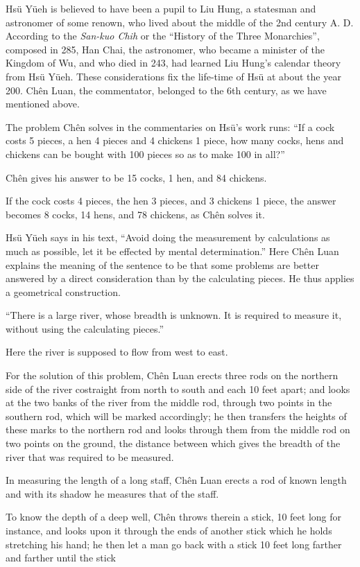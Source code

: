 \documentclass[11pt]{article}
\newcommand{\scanpage}[2]{\clearpage\setcounter{footnote}{0}\noindent{\footnotesize\color{gray}PDF page #1 · #2}\par\medskip}
\newcommand{\scanfooter}{}
\begin{document}
\scanpage{0058}{Part I, printed page 44}

Hsü Yüeh is believed to have been a pupil to Liu Hung, a statesman and astronomer of some renown, who lived about the middle of the 2nd century A. D. According to the \emph{San-kuo Chih} or the ``History of the Three Monarchies'', composed in 285, Han Chai, the astronomer, who became a minister of the Kingdom of Wu, and who died in 243, had learned Liu Hung's calendar theory from Hsü Yüeh. These considerations fix the life-time of Hsü at about the year 200. Chên Luan, the commentator, belonged to the 6th century, as we have mentioned above.

The problem Chên solves in the commentaries on Hsü's work runs: ``If a cock costs 5 pieces, a hen 4 pieces and 4 chickens 1 piece, how many cocks, hens and chickens can be bought with 100 pieces so as to make 100 in all?''

Chên gives his answer to be 15 cocks, 1 hen, and 84 chickens.

If the cock costs 4 pieces, the hen 3 pieces, and 3 chickens 1 piece, the answer becomes 8 cocks, 14 hens, and 78 chickens, as Chên solves it.

Hsü Yüeh says in his text, ``Avoid doing the measurement by calculations as much as possible, let it be effected by mental determination.'' Here Chên Luan explains the meaning of the sentence to be that some problems are better answered by a direct consideration than by the calculating pieces. He thus applies a geometrical construction.

``There is a large river, whose breadth is unknown. It is required to measure it, without using the calculating pieces.''

Here the river is supposed to flow from west to east.

For the solution of this problem, Chên Luan erects three rods on the northern side of the river costraight from north to south and each 10 feet apart; and looks at the two banks of the river from the middle rod, through two points in the southern rod, which will be marked accordingly; he then transfers the heights of these marks to the northern rod and looks through them from the middle rod on two points on the ground, the distance between which gives the breadth of the river that was required to be measured.

In measuring the length of a long staff, Chên Luan erects a rod of known length and with its shadow he measures that of the staff.

To know the depth of a deep well, Chên throws therein a stick, 10 feet long for instance, and looks upon it through the ends of another stick which he holds stretching his hand; he then let a man go back with a stick 10 feet long farther and farther until the stick
\scanfooter
\end{document}

